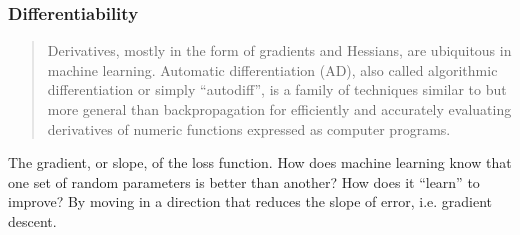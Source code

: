 \documentclass{beamer}
\begin{document}
\begin{frame}
	\frametitle{Differentiability}
	\begin{quote}
		Derivatives, mostly in the form of gradients and Hessians, are ubiquitous in machine learning. Automatic differentiation (AD), also called algorithmic differentiation or simply ``autodiff'', is a family of techniques similar to but more general than backpropagation for efficiently and accurately evaluating derivatives of numeric functions expressed as computer programs.
	\end{quote}
	The gradient, or slope, of the loss function. How does machine learning know that one set of random parameters is better than another? How does it ``learn'' to improve? By moving in a direction that reduces the slope of error, i.e. gradient descent.
\end{frame}

\end{document}
